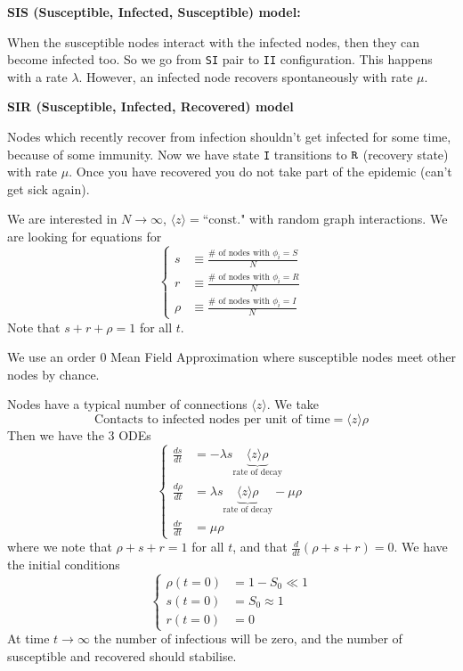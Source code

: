 \documentclass[12pt]{article}
\theoremstyle{definition}
\begin{document}
\textbf{SIS (Susceptible, Infected, Susceptible) model:}

When the susceptible nodes interact with the infected nodes, then they can become infected too. So we go from \verb|SI| pair to \verb|II| configuration. This happens with a rate $\lambda$. However, an infected node recovers spontaneously with rate $\mu$.

\textbf{SIR (Susceptible, Infected, Recovered) model}

Nodes which recently recover from infection shouldn't get infected for some time, because of some immunity. Now we have state \verb|I| transitions to $\verb|R|$ (recovery state) with rate $\mu$. Once you have recovered you do not take part of the epidemic (can't get sick again).

We are interested in $N\to \infty$, $\langle z\rangle = \text{``const."}$ with random graph interactions. We are looking for equations for
\[
\begin{cases}
    s &\equiv \frac{\#\text{ of nodes with $\phi_i = S$} }{N} \\
    r &\equiv \frac{\#\text{ of nodes with $\phi_i = R$}}{N} \\
    \rho &\equiv \frac{\#\text{ of nodes with $\phi_i = I$}}{N}
\end{cases}
\]
Note that $s+r+\rho=1$ for all $t$. 

We use an order $0$ Mean Field Approximation where susceptible nodes meet other nodes by chance. 

Nodes have a typical number of connections $\langle z\rangle$. 
We take
\[ \text{Contacts to infected nodes per unit of time} = \langle z\rangle \rho \]
Then we have the 3 ODEs
\[
\begin{cases}
    \frac{ds}{dt} &= -\lambda s\underbrace{\langle z  \rangle \rho}_{\text{rate of decay} }\\
    \frac{d\rho}{dt} &=  \lambda s\underbrace{\langle z  \rangle \rho}_{\text{rate of decay} } - \mu \rho\\
    \frac{dr}{dt} &= \mu\rho
\end{cases}
\]
where we note that $\rho+s+r=1$ for all $t$, and that $\frac{d}{dt}(\rho+s+r)=0$. We have the initial conditions
\[
\begin{cases}
    \rho(t=0)&=1-S_0 \ll 1 \\
    s(t=0)&=S_0\approx 1 \\
    r(t=0)&=0
\end{cases}
\]
At time $t\to \infty $ the number of infectious will be zero, and the number of susceptible and recovered should stabilise.
\end{document}

